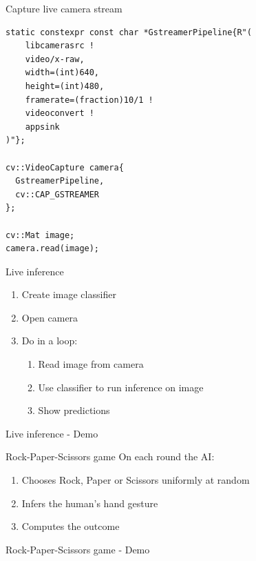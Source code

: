 \begin{frame}[fragile]{Capture live camera stream}
  \lstset{basicstyle=\ttfamily\small, showstringspaces=false, numbers=left,
  columns=fullflexible}
  \begin{lstlisting}
static constexpr const char *GstreamerPipeline{R"(
    libcamerasrc !
    video/x-raw,
    width=(int)640,
    height=(int)480,
    framerate=(fraction)10/1 !
    videoconvert !
    appsink
)"};

cv::VideoCapture camera{
  GstreamerPipeline,
  cv::CAP_GSTREAMER
};

cv::Mat image;
camera.read(image);
  \end{lstlisting}
\end{frame}

\begin{frame}{Live inference}
  \begin{enumerate}
	\item Create image classifier
	\item Open camera
	\item Do in a loop:
	\begin{enumerate}
	  \item Read image from camera
	  \item Use classifier to run inference on image
	  \item Show predictions
	\end{enumerate}
  \end{enumerate}
\end{frame}

\begin{frame}{Live inference - Demo}
\end{frame}

\begin{frame}{Rock-Paper-Scissors game}
On each round the AI:
  \begin{enumerate}
	\item Chooses Rock, Paper or Scissors uniformly at random
	\item Infers the human's hand gesture
	\item Computes the outcome
  \end{enumerate}
\end{frame}

\begin{frame}{Rock-Paper-Scissors game - Demo}
\end{frame}

